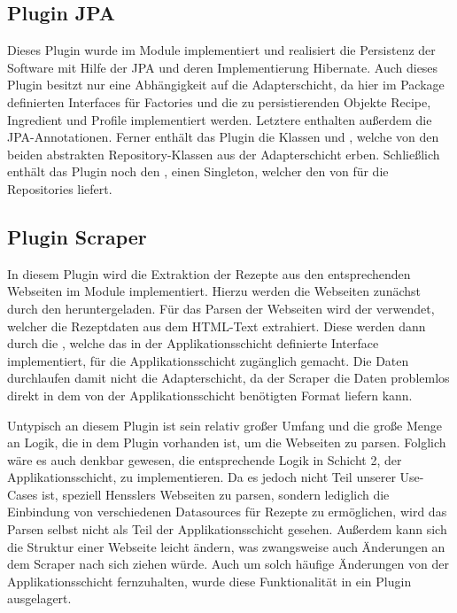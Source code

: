 \subsection{Plugin JPA}
Dieses Plugin wurde im Module \href{https://github.com/anditru/quickie/tree/bb41442c7f1ffbfcd3117cd86a40f7932e543a33/0-quickie-plugin-jpa}{} implementiert und realisiert die Persistenz der Software mit Hilfe der \ac{JPA} und deren Implementierung Hibernate. Auch dieses Plugin besitzt nur eine Abhängigkeit auf die Adapterschicht, da hier im Package \href{https://github.com/anditru/quickie/tree/bb41442c7f1ffbfcd3117cd86a40f7932e543a33/1-quickie-adapters/src/main/java/org/pinkcrazyunicorn/quickie/adapters/persistence}{} definierten Interfaces für Factories und die zu persistierenden Objekte Recipe, Ingredient und Profile implementiert werden. Letztere enthalten außerdem die \ac{JPA}-Annotationen. Ferner enthält das Plugin die Klassen  und , welche von den beiden abstrakten Repository-Klassen aus der Adapterschicht erben. Schließlich enthält das Plugin noch den , einen Singleton, welcher den  von  für die Repositories liefert.

\subsection{Plugin Scraper}
In diesem Plugin wird die Extraktion der Rezepte aus den entsprechenden Webseiten im Module \href{https://github.com/anditru/quickie/tree/bb41442c7f1ffbfcd3117cd86a40f7932e543a33/0-quickie-plugin-scraper}{} implementiert. Hierzu werden die Webseiten zunächst durch den  heruntergeladen. Für das Parsen der Webseiten wird der  verwendet, welcher die Rezeptdaten aus dem HTML-Text extrahiert. Diese werden dann durch die , welche das in der Applikationsschicht definierte Interface  implementiert, für die Applikationsschicht zugänglich gemacht. Die Daten durchlaufen damit nicht die Adapterschicht, da der Scraper die Daten problemlos direkt in dem von der Applikationsschicht benötigten Format liefern kann.

Untypisch an diesem Plugin ist sein relativ großer Umfang und die große Menge an Logik, die in dem Plugin vorhanden ist, um die Webseiten zu parsen. Folglich wäre es auch denkbar gewesen, die entsprechende Logik in Schicht 2, der Applikationsschicht, zu implementieren. Da es jedoch nicht Teil unserer Use-Cases ist, speziell Hensslers Webseiten zu parsen, sondern lediglich die Einbindung von verschiedenen Datasources für Rezepte zu ermöglichen, wird das Parsen selbst nicht als Teil der Applikationsschicht gesehen. Außerdem kann sich die Struktur einer Webseite leicht ändern, was zwangsweise auch Änderungen an dem Scraper nach sich ziehen würde. Auch um solch häufige Änderungen von der Applikationsschicht fernzuhalten, wurde diese Funktionalität in ein Plugin ausgelagert.

